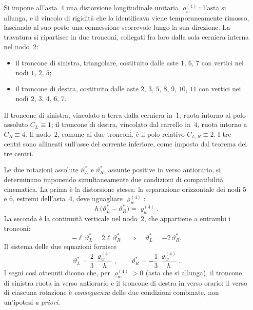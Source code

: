 \begin{esempio}
\begin{svolgimento}



		
		Si impone all'asta~$4$ una distorsione longitudinale unitaria
		$\varrho_w^{(4)}$: l'asta si allunga, e il vincolo di rigidità che
		la identificava viene temporaneamente rimosso, lasciando al suo
		posto una connessione scorrevole lungo la sua direzione. La
		travatura si ripartisce in due tronconi, collegati fra loro dalla
		sola cerniera interna nel nodo~$2$:
		\begin{itemize}[noitemsep,topsep=2pt]
			\item il troncone di sinistra, triangolare, costituito dalle
			aste $1$, $6$, $7$ con vertici nei nodi $1$, $2$, $5$;
			\item il troncone di destra, costituito dalle aste $2$, $3$,
			$5$, $8$, $9$, $10$, $11$ con vertici nei nodi $2$, $3$, $4$,
			$6$, $7$.
		\end{itemize}
		Il troncone di sinistra, vincolato a terra dalla cerniera in~$1$,
		ruota intorno al polo assoluto $C_L\equiv 1$; il troncone di
		destra, vincolato dal carrello in~$4$, ruota intorno a $C_R\equiv 4$.
		Il nodo~$2$, comune ai due tronconi, è il polo relativo
		$C_{L,R}\equiv 2$. I tre centri sono allineati sull'asse del
		corrente inferiore, come imposto dal teorema dei tre centri.
		
		Le due rotazioni assolute $\vartheta_L^*$ e $\vartheta_R^*$,
		assunte positive in verso antiorario, si determinano imponendo
		simultaneamente due condizioni di compatibilità cinematica. La
		prima è la distorsione stessa: la separazione orizzontale dei
		nodi $5$ e $6$, estremi dell'asta~$4$, deve uguagliare
		$\varrho_w^{(4)}$:
		\begin{equation*}
			h\,\bigl(\vartheta_L^* - \vartheta_R^*\bigr) = \varrho_w^{(4)}.
		\end{equation*}
		La seconda è la continuità verticale nel nodo~$2$, che appartiene
		a entrambi i tronconi:
		\begin{equation*}
			-\ell\,\vartheta_L^* = 2\ell\,\vartheta_R^*
			\quad\Longrightarrow\quad
			\vartheta_L^* = -2\,\vartheta_R^*.
		\end{equation*}
		Il sistema delle due equazioni fornisce
		\begin{equation*}
			\vartheta_L^* = \frac{2}{3}\,\frac{\varrho_w^{(4)}}{h},
			\qquad
			\vartheta_R^* = -\frac{1}{3}\,\frac{\varrho_w^{(4)}}{h}.
		\end{equation*}
		I segni così ottenuti dicono che, per $\varrho_w^{(4)}>0$ (asta
		che si allunga), il troncone di sinistra ruota in verso antiorario
		e il troncone di destra in verso orario: il verso di ciascuna
		rotazione è \emph{conseguenza} delle due condizioni combinate, non
		un'ipotesi \emph{a priori}.
		

\end{svolgimento}
\end{esempio}
